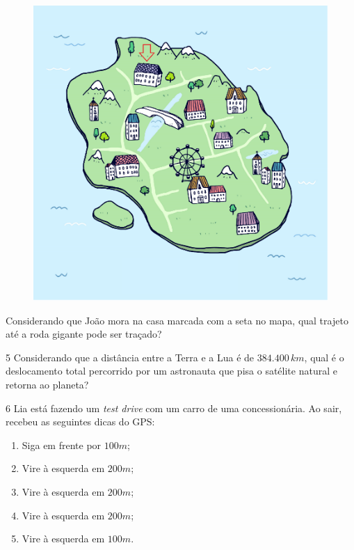 \begin{figure}[H]
\centering\includegraphics[width=.5\textwidth]{./imgSAEB_8_MAT/media/image38.png}
\end{figure}


Considerando que João mora na casa marcada com a seta no mapa, qual
trajeto até a roda gigante pode ser traçado?


\num{5} Considerando que a distância entre a Terra e a Lua é de $384.400\,km$,
qual é o deslocamento total percorrido por um astronauta que pisa o
satélite natural e retorna ao planeta?



\num{6} Lia está fazendo um \textit{test drive} com um carro de uma concessionária. Ao
sair, recebeu as seguintes dicas do GPS:

\begin{enumerate}[itemsep=0pt]
\item Siga em frente por $100 m$;
\item Vire à esquerda em $200 m$;
\item Vire à esquerda em $200 m$;
\item Vire à esquerda em $200 m$;
\item Vire à esquerda em $100 m$.
\end{enumerate}

